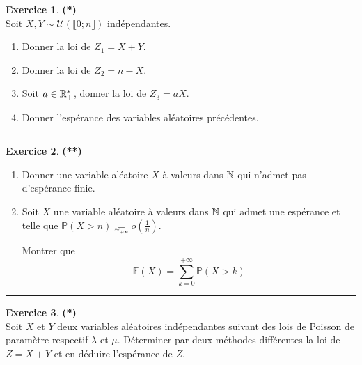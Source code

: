 \documentclass[a4paper,11pt]{article}
\theoremstyle{definition}
\newtheorem{exo}{Exercice} %
\begin{document}
   
\begin{minipage}{1\linewidth}\begin{minipage}[t]{0.48\linewidth}\raggedright
	
\begin{exo}\textbf{(*)}\quad\\[0.2cm] %
	Soit $X,Y\sim \mathcal{U}(\llbracket0;n\rrbracket)$ indépendantes.\\
	\begin{enumerate}
		\item Donner la loi de $Z_1 = X+Y$. 
		\item Donner la loi de $Z_2 = n-X$.
		\item Soit $a\in\mathbb{R}^*_+$, donner la loi de $Z_3 = aX$.
		\item Donner l'espérance des variables aléatoires précédentes. 
	\end{enumerate}
	
\centering\rule{1\linewidth}{0.6pt}\end{exo}



\begin{exo}\textbf{(**)}\quad\\[0.2cm]
	\begin{enumerate}
		\item Donner une variable aléatoire $X$ à valeurs dans $\mathbb{N}$ qui n'admet pas d'espérance finie.
		\item Soit $X$ une variable aléatoire à valeurs dans $\mathbb{N}$ qui admet une espérance et telle que $\mathbb{P}(X>n) \underset{\sim_{+\infty}}{=}o\left(\frac{1}{n}\right)$.
		
		 Montrer que  $$\mathbb{E}(X) = \sum_{k=0}^{+\infty}\mathbb{P}(X> k)$$
	\end{enumerate}
	

	\centering\rule{1\linewidth}{0.6pt}\end{exo}




\end{minipage}\hfill\vrule\hfill\begin{minipage}[t]{0.48\linewidth}\raggedright

\begin{exo}\textbf{(*)}\quad\\[0.2cm]
Soit $X$ et $Y$ deux variables aléatoires indépendantes suivant des lois de Poisson de paramètre respectif $\lambda$ et $\mu$. Déterminer par deux méthodes différentes la loi de $Z = X+Y$ et en déduire l'espérance de $Z$. 


\end{exo}
\end{minipage}
\end{minipage}
\end{document}
